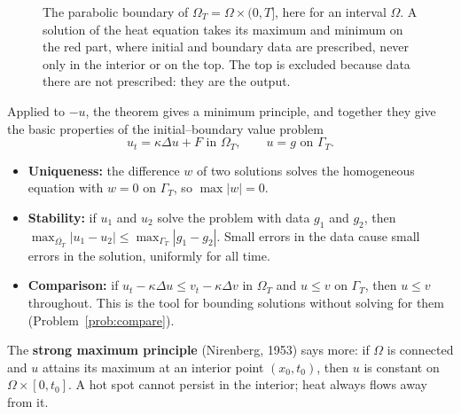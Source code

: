 \documentclass[11pt,a4paper]{article}
\numberwithin{equation}{section}
\theoremstyle{definition}
\begin{document}
\begin{figure}[H]
\centering
{}
\caption{The parabolic boundary of $\Omega_T = \Omega \times (0, T]$, here for an interval $\Omega$. A solution of the heat equation takes its maximum and minimum on the red part, where initial and boundary data are prescribed, never only in the interior or on the top. The top is excluded because data
there are not prescribed: they are the output.}
\label{fig:parabolic}
\end{figure}

Applied to $-u$, the theorem gives a minimum principle, and together they give the basic properties of the initial--boundary value problem
\[
u_t = \kappa\Delta u + F \text{ in } \Omega_T, \qquad u = g \text{ on } \Gamma_T .
\]
\begin{itemize}
\item \textbf{Uniqueness:} the difference $w$ of two solutions solves the homogeneous equation with $w = 0$ on $\Gamma_T$, so $\max|w| = 0$.
\item \textbf{Stability:} if $u_1$ and $u_2$ solve the problem with data $g_1$ and $g_2$, then $\max_{\overline{\Omega_T}}|u_1 - u_2| \leq \max_{\Gamma_T}|g_1 - g_2|$. Small errors in the data cause small errors in the solution, uniformly for all time.
\item \textbf{Comparison:} if $u_t - \kappa\Delta u \leq v_t - \kappa\Delta v$ in $\Omega_T$ and $u \leq v$ on $\Gamma_T$, then $u \leq v$ throughout. This is the tool for bounding solutions without solving for them (Problem~\ref{prob:compare}).
\end{itemize}
The \textbf{strong maximum principle} (Nirenberg, 1953) says more: if $\Omega$ is connected and $u$ attains its maximum at an interior point $(x_0, t_0)$, then $u$ is constant on $\Omega \times [0, t_0]$. A hot spot cannot persist in the interior; heat always flows away from it.
\end{document}
